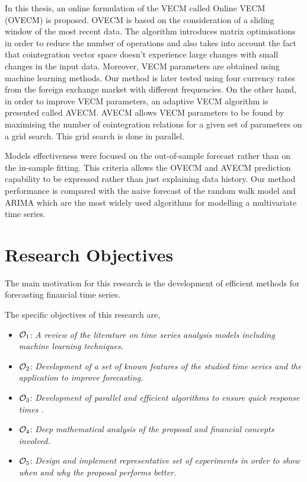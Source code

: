 In this thesis, an online formulation of the VECM called Online VECM (OVECM) is
proposed. OVECM is based on the consideration of a sliding window of the most
recent data.  The algorithm introduces matrix optimisations in order to reduce
the number of operations and also takes into account the fact that cointegration
vector space doesn't experience large changes with small changes in the input
data. Moreover, VECM parameters are obtained using machine learning methods. Our
method is later tested using four currency rates from the foreign exchange
market with different frequencies.  On the other hand, in order to improve VECM
parameters, an adaptive VECM algorithm is presented called AVECM. AVECM allows
VECM parameters to be found by maximising the number of cointegration relations
for a given set of parameters on a grid search. This grid search is done in
parallel.

Models effectiveness were focused on the out-of-sample forecast rather than on
the in-sample fitting. This criteria allows the OVECM and AVECM prediction
capability to be expressed rather than just explaining data history. Our method
performance is compared with the naive forecast of the random walk model and
ARIMA which are the most widely used algorithms for modelling a multivariate
time series.


\section{Research Objectives}
The main motivation for this research is the development of efficient methods
for forecasting financial time series.

The specific objectives of this research are,
\begin{itemize}[noitemsep,topsep=0pt]
\item $\Large \mathcal{O}_1$: \emph{A review of the literature on time series
analysis models including machine learning techniques.}
\item $\Large \mathcal{O}_2$: \emph{Development of a set of known features of the
studied time series and the application to improve forecasting.}
\item $\Large \mathcal{O}_3$: \emph{Development of parallel and efficient
algorithms to ensure quick response times .}
\item $\Large \mathcal{O}_4$: \emph{Deep mathematical analysis of the proposal
and financial concepts involved.}
\item $\Large \mathcal{O}_5$: \emph{Design and implement representative set of
experiments in order to show when and why the proposal performs better.}
\end{itemize}


